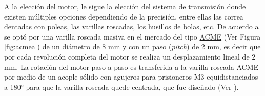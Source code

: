 A la elección del motor, le sigue la elección del sistema de transmisión donde existen múltiples opciones dependiendo de la precisión, entre ellas las correa dentadas con poleas, las varillas roscadas, los husillos de bolas, etc. De acuerdo a \cite{schaa} se optó por una varilla roscada masiva en el mercado del tipo \href{https://www.mcmaster.com/acme-screws/acme-lead-screws-and-nuts/}{ACME} (Ver Figura \ref{fig:acmea}) de un diámetro de 8 mm y con un paso (\textit{pitch}) de 2 mm, es decir que por cada revolución completa del motor se realiza un desplazamiento lineal de 2 mm. La rotación del motor paso a paso es transferida a la varilla roscada ACME por medio de un acople sólido con agujeros para prisioneros M3 equidistanciados a 180° para que la varilla roscada quede centrada, que fue diseñado (Ver \href{https://github.com/jrr1984/open_frame_XYStage/blob/master/3dprintedparts/STLs/acopleRIGIDO.STL}{\faCubes}).
\begin{figure}[H]
	\begin{floatrow}
	\end{floatrow}
\end{figure}

